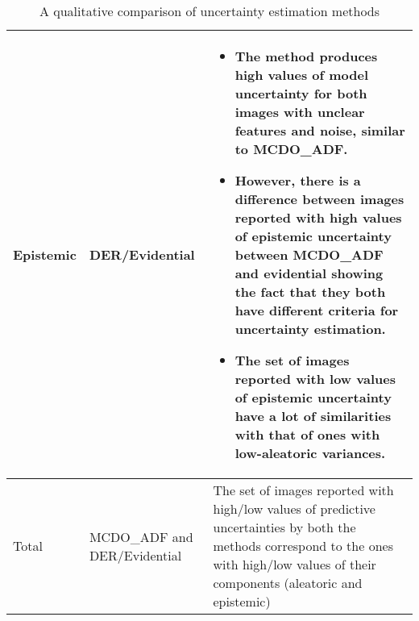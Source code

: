 \begin{table}[H]
\begin{tabular}[h]{|p{1.5cm}|p{2.3cm}|p{12.5cm}|}
\hline
Epistemic&DER/Evidential&\begin{itemize}\item The method produces high values of model uncertainty for both images with unclear features and noise, similar to MCDO\_ADF.\item However, there is a difference between images reported with high values of epistemic uncertainty between MCDO\_ADF and evidential showing the fact that they both have different criteria for uncertainty estimation.\item The set of images reported with low values of epistemic uncertainty have a lot of similarities with that of ones with low-aleatoric variances.\end{itemize}\\
\hline
Total& MCDO\_ADF and DER/Evidential& The set of images reported with high/low values of predictive uncertainties by both the methods correspond to the ones with high/low values of their components (aleatoric and epistemic)\\
\hline
\end{tabular}
\caption{A qualitative comparison of uncertainty estimation methods}
\label{tab_qualit_compare}
\end{table}


